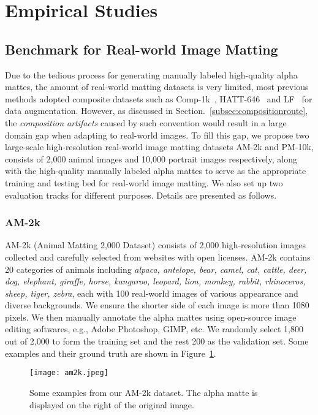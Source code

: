 \documentclass[twocolumn]{svjour3}
\begin{document}
\section{Empirical Studies}
\label{sec:experiments}

\subsection{Benchmark for Real-world Image Matting}
\label{sec:dataset}
Due to the tedious process for generating manually labeled high-quality alpha mattes, the amount of real-world matting datasets is very limited, most previous methods adopted composite datasets such as Comp-1k~\citep{xu2017deep}, HATT-646~\citep{Qiao_2020_CVPR} and LF~\citep{zhang2019late} for data augmentation. However, as discussed in Section.~\ref{subsec:compositionroute}, the \emph{composition artifacts} caused by such convention would result in a large domain gap when adapting to real-world images. To fill this gap, we propose two large-scale high-resolution real-world image matting datasets AM-2k and PM-10k, consists of 2,000 animal images and 10,000 portrait images respectively, along with the high-quality manually labeled alpha mattes to serve as the appropriate training and testing bed for real-world image matting. We also set up two evaluation tracks for different purposes. Details are presented as follows.


\subsubsection{AM-2k}
AM-2k (Animal Matting 2,000 Dataset) consists of 2,000 high-resolution images collected and carefully selected from websites with open licenses. AM-2k contains 20 categories of animals including \textit{alpaca, antelope, bear, camel, cat, cattle, deer, dog, elephant, giraffe, horse, kangaroo, leopard, lion, monkey, rabbit, rhinoceros, sheep, tiger, zebra}, each with 100 real-world images of various appearance and diverse backgrounds. We ensure the shorter side of each image is more than 1080 pixels. We then manually annotate the alpha mattes using open-source image editing softwares, e.g., Adobe Photoshop, GIMP, etc. We randomly select 1,800 out of 2,000 to form the training set and the rest 200 as the validation set. Some examples and their ground truth are shown in Figure~\ref{fig:am2k_examples}. 

\begin{figure}[htb]
    \centering
    \texttt{[image: am2k.jpeg]}
     \caption{Some examples from our AM-2k dataset. The alpha matte is displayed on the right of the original image.}
    \label{fig:am2k_examples}
\end{figure}
\end{document}
